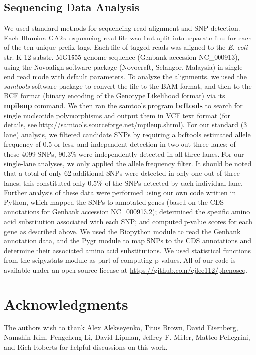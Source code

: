 \documentclass[letterpaper,10pt,english]{howto}
\begin{document}
\subsection{Sequencing Data Analysis}

We used standard methods for sequencing read alignment and SNP detection.
Each Illumina GA2x sequencing read file was first split into separate
files for each of the ten unique prefix tags.  Each file of
tagged reads was aligned to the \emph{E. coli}
str. K-12 substr. MG1655 genome sequence (Genbank accession NC\_000913),
using the Novoalign software package (Novocraft, Selangor, Malaysia)
in single-end read mode with default parameters.
To analyze the alignments, we used the \emph{samtools} software package
\cite{LiSAM09}  to convert the file to the BAM format, and then
to the BCF format (binary encoding of the Genotype Likelihood format)
via its \textbf{mpileup} command.  We then ran the samtools program
\textbf{bcftools} to search for single nucleotide polymorphisms
and output them in VCF text format
(for details, see \href{http://samtools.sourceforge.net/mpileup.shtml}{http://samtools.sourceforge.net/mpileup.shtml}).
For our standard (3 lane) analysis, we filtered candidate
SNPs by requiring a bcftools estimated allele frequency of 0.5 or less,
and independent detection in two out three lanes; of these 4099 SNPs,
90.3\% were independently detected in all three lanes.
For our single-lane analyses, we only applied the allele
frequency filter.  It should be noted that a total of
only 62 additional SNPs
were detected in only one out of three lanes; this constituted
only 0.5\% of the SNPs detected by each individual lane.
Further analysis of these data were
performed using our own code written in Python, which mapped
the SNPs to annotated genes (based on the CDS annotations
for Genbank accession NC\_000913.2); determined the specific
amino acid substitution associated with each SNP; and computed
p-value scores for each gene as described above.  We used the
Biopython module \cite{Biopython2009}  to read the Genbank annotation data,
and the Pygr module \cite{LeePygr09}  to map SNPs to the CDS annotations and
determine their associated amino acid substitutions.
We used statistical functions from the scipy.stats module
\cite{Scipy2001}  as part of computing p-values.
All of our code is available under an open source license
at \href{https://github.com/cjlee112/phenoseq}{https://github.com/cjlee112/phenoseq}.


\section{Acknowledgments}

The authors wish to thank Alex Alekseyenko, Titus Brown, David Eisenberg,
Namshin Kim, Pengcheng Li, David Lipman, Jeffrey F. Miller,
Matteo Pellegrini, and Rich Roberts for helpful discussions on
this work.


\renewcommand{\indexname}{Module Index}
\printmodindex
\renewcommand{\indexname}{Index}
\printindex
\end{document}
